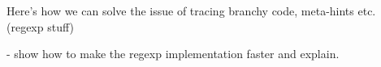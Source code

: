 
Here's how we can solve the issue of tracing branchy code, meta-hints
etc. (regexp stuff)

- show how to make the regexp implementation faster and explain.

